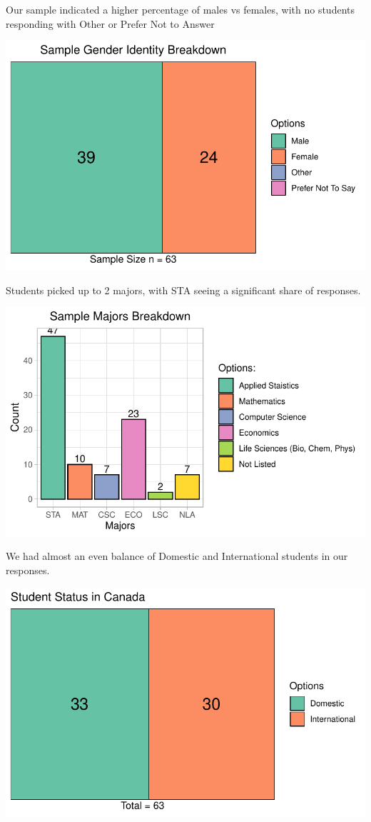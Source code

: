 \documentclass[
  letterpaper,
  DIV=11,
  numbers=noendperiod]{scrartcl}
\begin{document}
Our sample indicated a higher percentage of males vs females, with no
students responding with Other or Prefer Not to Answer

\includegraphics{technical_report_files/figure-pdf/p2-1.pdf}

Students picked up to 2 majors, with STA seeing a significant share of
responses.

\includegraphics{technical_report_files/figure-pdf/p3-1.pdf}

We had almost an even balance of Domestic and International students in
our responses.

\includegraphics{technical_report_files/figure-pdf/p4-1.pdf}
\end{document}
